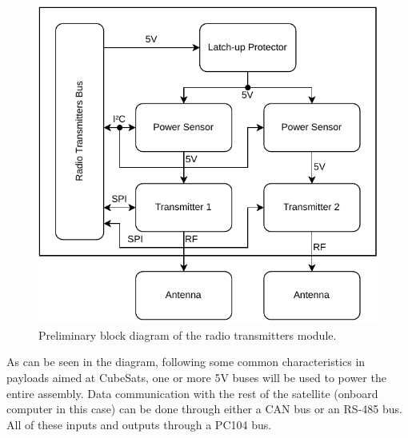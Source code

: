 \begin{figure}[!ht]
    \begin{center}
        \includegraphics[width=0.6\columnwidth]{figures/radios-block-diagram}
        \caption{Preliminary block diagram of the radio transmitters module.}
        \label{fig:payload-block-diagram-radios}
    \end{center}
\end{figure}


As can be seen in the diagram, following some common characteristics in payloads aimed at CubeSats, one or more 5V buses will be used to power the entire assembly. Data communication with the rest of the satellite (onboard computer in this case) can be done through either a CAN bus or an RS-485 bus. All of these inputs and outputs through a PC104 bus.


